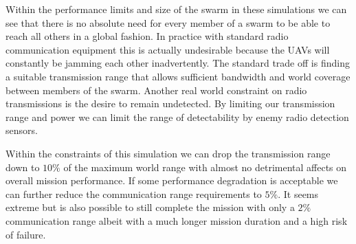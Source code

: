 \begin{multicols*}{2}





Within the performance limits and size of the swarm in these simulations we can see that there is no absolute need for every member of a swarm to be able to reach all others in a global fashion.  In practice with standard radio communication  equipment this is actually undesirable because the UAVs will constantly be jamming each other inadvertently.  The standard trade off is finding a suitable transmission range that allows sufficient bandwidth and world coverage between members of the swarm.  Another real world constraint on radio transmissions is the desire to remain undetected.  By limiting our transmission range and power we can limit the range of detectability by enemy radio detection sensors.

Within the constraints of this simulation we can drop the transmission range down to $10\%$ of the maximum world range with almost no detrimental affects on overall mission performance.  If some performance degradation is acceptable we can further reduce the communication range requirements to $5\%$.  It seems extreme but is also possible to still complete the mission with only a $2\%$ communication range albeit with a much longer mission duration and a high risk of failure.


\end{multicols*}

